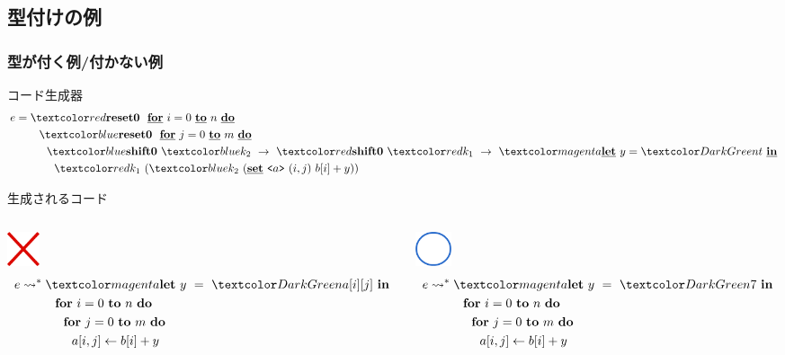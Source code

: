 
\subsection{型付けの例}

\begin{frame}
  \frametitle{型が付く例/付かない例}
  コード生成器
  \begin{align*}
    e & = \red{\Resetz} ~~\cfordo{i = 0}{n} \\
      & \phantom{=}~~~~\blue{\Resetz} ~~\cfordo{j = 0}{m} \\
      & \phantom{=}~~~~~~ \blue{\Shiftz}~\blue{k_2}~\to~ \red{\Shiftz}~\red{k_1}~\to~ \magenta{\cLet~y=\green{t}~\cIn} \\
      & \phantom{=}~~~~~~~~ \red{k_1}~(\blue{k_2}~(\caryset{\code{a}}{(i,j)}{b[i] + y}))
  \end{align*}

  \pause
  生成されるコード
  \begin{columns}
    \begin{column}{0.5\textwidth}%
      \center
      \includegraphics[clip,height=1cm]{./img/batsu.png}
      \begin{align*}
        e & \too \magenta{\Let ~y ~= ~\green{a[i][j]} ~\In} \\
          & \phantom{\too}~~~~ \fordo{i = 0}{n} \\
          & \phantom{\too}~~~~~~\fordo{j = 0}{m} \\
          & \phantom{\too}~~~~~~~~\aryset{a}{i,j}{b[i] + y} \\
      \end{align*}
    \end{column}

    \begin{column}{0.5\textwidth}%
      \center
      \includegraphics[height=1cm]{./img/maru.png}
      \begin{align*}
        e & \too \magenta{\Let ~y ~= ~\green{7} ~\In} \\
          & \phantom{\too}~~~~ \fordo{i = 0}{n} \\
          & \phantom{\too}~~~~~~\fordo{j = 0}{m} \\
          & \phantom{\too}~~~~~~~~\aryset{a}{i,j}{b[i] + y} \\
      \end{align*}
    \end{column}
  \end{columns}
\end{frame}

